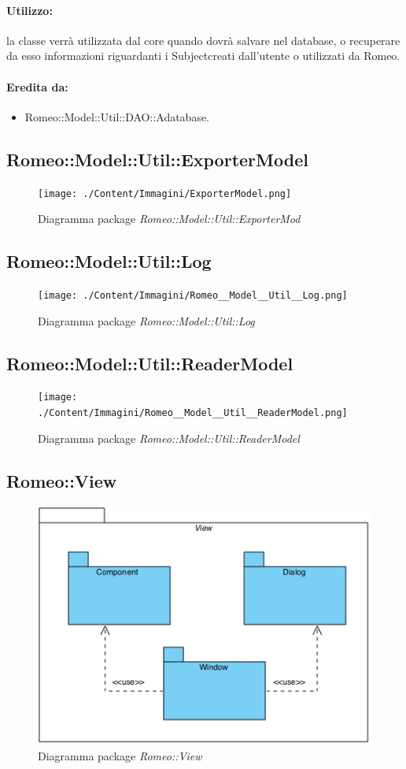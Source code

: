 	\paragraph{Utilizzo:} la classe verrà utilizzata dal core quando dovrà salvare nel database, o recuperare da esso informazioni riguardanti i Subject\g creati dall’utente o utilizzati da Romeo.
	\paragraph{Eredita da:}
		\begin{itemize}
			\item Romeo::Model::Util::DAO::Adatabase.
		\end{itemize}
\subsection{Romeo::Model::Util::ExporterModel}
	\begin{figure} [!h]
		\centering
		\texttt{[image: ./Content/Immagini/ExporterModel.png]}
		\caption{Diagramma package \textsl{Romeo::Model::Util::ExporterMod}}
	\end{figure}
\subsection{Romeo::Model::Util::Log}
	\begin{figure} [!h]
		\centering
		\texttt{[image: ./Content/Immagini/Romeo\_\_Model\_\_Util\_\_Log.png]}
		\caption{Diagramma package \textsl{Romeo::Model::Util::Log}}
	\end{figure}
\subsection{Romeo::Model::Util::ReaderModel}
	\begin{figure} [!h]
		\centering
		\texttt{[image: ./Content/Immagini/Romeo\_\_Model\_\_Util\_\_ReaderModel.png]}
		\caption{Diagramma package \textsl{Romeo::Model::Util::ReaderModel}}
	\end{figure}
\subsection{Romeo::View}
	\begin{figure} [!h]
		\centering
		\includegraphics[scale=0.5] {./Content/Immagini/Romeo__View.png}
		\caption{Diagramma package \textsl{Romeo::View}}
	\end{figure}
